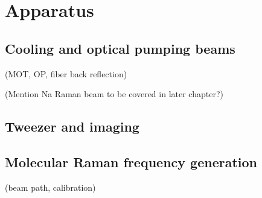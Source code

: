 
\chapter{Apparatus}
\section{Cooling and optical pumping beams}
(MOT, OP, fiber back reflection)

(Mention Na Raman beam to be covered in later chapter?)

\section{Tweezer and imaging}

\section{Molecular Raman frequency generation}
(beam path, calibration)
